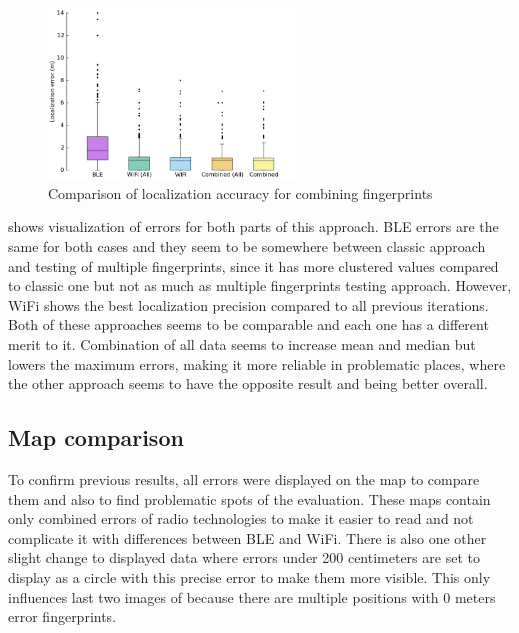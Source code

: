 \begin{figure}[h!]
	\begin{centering}
		\includegraphics[width=0.6\textwidth]{img/wknn_errors_combined}
		\par\end{centering}
	\caption{Comparison of localization accuracy for combining fingerprints}
	\label{fig08c06}
\end{figure}

 shows visualization of errors for both parts of this approach. BLE errors are the same for both cases and they seem to be somewhere between classic approach and testing of multiple fingerprints, since it has more clustered values compared to classic one but not as much as multiple fingerprints testing approach. However, WiFi shows the best localization precision compared to all previous iterations. Both of these approaches seems to be comparable and each one has a different merit to it. Combination of all data seems to increase mean and median but lowers the maximum errors, making it more reliable in problematic places, where the other approach seems to have the opposite result and being better overall.

\subsection{Map comparison}\label{sec:MapComparison}
To confirm previous results, all errors were displayed on the map to compare them and also to find problematic spots of the evaluation. These maps contain only combined errors of radio technologies to make it easier to read and not complicate it with differences between BLE and WiFi. There is also one other slight change to displayed data where errors under 200 centimeters are set to display as a circle with this precise error to make them more visible. This only influences last two images of  because there are multiple positions with 0 meters error fingerprints.

